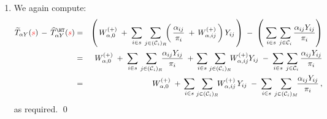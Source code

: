 \begin{enumerate}
\begin{eqnarray*}
            \; + \,
            W^{(+)}_{\alpha,ij}
            \,\right)
        Y_{ij}
    \end{eqnarray*}
\item
    We again compute:
    \begin{eqnarray*}
    \widetilde{T}_{\alpha Y}({\color{red}s})
    \, - \,
    \widehat{T}^{\HT}_{\alpha Y}({\color{red}s})
    & = &
        \left(\,
            W^{(+)}_{\alpha,0}
            \; + \;
            \underset{i \in {\color{black}s}}{\sum}\;
            \underset{j \in (\mathcal{C}_{i})_{R}}{\sum}\!\!
            \left(\,
                \dfrac{
                    \alpha_{ij} %
                    }{
                    \pi_{i}
                    }
                \; + \,
                W^{(+)}_{\alpha,ij}
                \,\right)
            Y_{ij}
            \,\right)
        \; - \;
        \left(\;
            \underset{i \in s}{\sum}\;
            \underset{j \in \mathcal{C}_{i}}{\sum}\,
            \dfrac{\alpha_{ij}Y_{ij}}{\pi_{i}}
            \right)
    \\
    & = &
        W^{(+)}_{\alpha,0}
        \; + \;
            \underset{i \in {\color{black}s}}{\sum}\;
            \underset{j \in (\mathcal{C}_{i})_{R}}{\sum}\!
            \dfrac{
                \alpha_{ij}Y_{ij}
                }{
                \pi_{i}
                }
            \; + \,
            \underset{i \in {\color{black}s}}{\sum}\,
            \underset{j \in (\mathcal{C}_{i})_{R}}{\sum}\!
            W^{(+)}_{\alpha,ij}Y_{ij}
        \; - \;
        \underset{i \in s}{\sum}\;
        \underset{j \in \mathcal{C}_{i}}{\sum}\,
        \dfrac{\alpha_{ij}Y_{ij}}{\pi_{i}}
    \\
    & = &
        W^{(+)}_{\alpha,0}
        \; + \,
        \underset{i \in {\color{black}s}}{\sum}\,
        \underset{j \in (\mathcal{C}_{i})_{R}}{\sum}\!
        W^{(+)}_{\alpha,ij}\,Y_{ij}
        \; - \;
        \underset{i \in {\color{black}s}}{\sum}\;
        \underset{j \in (\mathcal{C}_{i})_{M}}{\sum}\!
        \dfrac{ \alpha_{ij}Y_{ij} }{ \pi_{i} }\,,
    \end{eqnarray*}
    as required.
    \qed
\end{enumerate}


